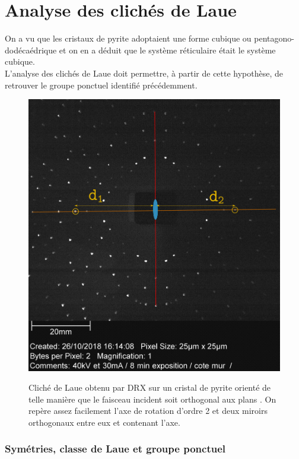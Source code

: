 \section{Analyse des clichés de Laue}

On a vu que les cristaux de pyrite  adoptaient une forme cubique ou pentagono-dodécaédrique et on en a déduit que le système réticulaire était le système cubique. \\
L'analyse des clichés de Laue doit permettre, à partir de cette hypothèse, de retrouver le groupe ponctuel identifié précédemment.

\begin{figure}
\caption{Cliché de Laue obtenu par DRX sur un cristal de pyrite orienté de telle manière que le faisceau incident soit orthogonal aux plans . On repère assez facilement l'axe de rotation d'ordre 2 et deux miroirs orthogonaux entre eux et contenant l'axe.}
\includegraphics[width=0.85\columnwidth]{figures/Laue_Pyrite_3_symetries}
\label{fig:laueCliche}
\end{figure}

\subsubsection{Symétries, classe de Laue et groupe ponctuel}

